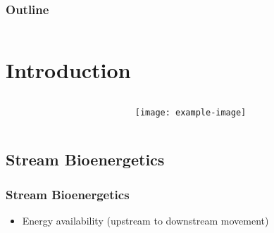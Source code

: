 \documentclass{beamer}
\begin{document}
\begin{frame}
\titlepage
\end{frame}

\begin{frame}
    \frametitle{Outline}
    \begin{columns}[t]
        \begin{column}{.5\textwidth}
            \footnotesize
            \tableofcontents[sections={1-2}]
        \end{column}
        \begin{column}{.5\textwidth}
            \footnotesize
            \tableofcontents[sections={3-4}]
        \end{column}
    \end{columns}
\end{frame}

\section{Introduction}
\begin{frame}
  \begin{columns}[T]
      \begin{column}{.5\textwidth}
          \footnotesize
          \tableofcontents[currentsection,hideallsubsections,subsubsectionstyle=hide]
      \end{column}
      \begin{column}{.5\textwidth}
          \texttt{[image: example-image]}
      \end{column}
  \end{columns}
\end{frame}

\subsection{Stream Bioenergetics}

\begin{frame}
\frametitle{Stream Bioenergetics}
\begin{itemize}
\item Energy availability (upstream to downstream movement)
\end{itemize}
\end{frame}
\end{document}
